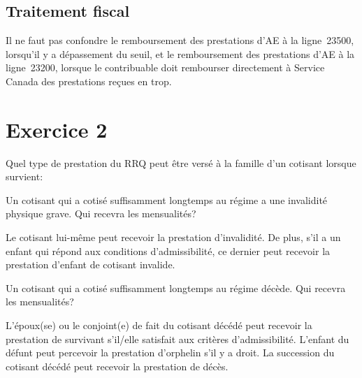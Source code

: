 \subsection{Traitement fiscal}
Il ne faut pas confondre le remboursement des prestations d'AE à la ligne~23500, lorsqu'il y a dépassement du seuil, et le remboursement des prestations d'AE à la ligne~23200, lorsque le contribuable doit rembourser directement à Service Canada des prestations reçues en trop.



\section{Exercice 2}
\setcounter{question}{0}
\begin{question}
	Quel type de prestation du RRQ peut être versé à la famille d'un cotisant lorsque survient: 
\end{question}
\setcounter{sousQuestion}{0}
\begin{sousQuestion}
	Un cotisant qui a cotisé suffisamment longtemps au régime a une invalidité physique grave. Qui recevra les mensualités?
\end{sousQuestion}
Le cotisant lui-même peut recevoir la prestation d'invalidité. De plus, s'il a un enfant qui répond aux conditions d'admissibilité, ce dernier peut recevoir la prestation d'enfant de cotisant invalide.

\begin{sousQuestion}
	Un cotisant qui a cotisé suffisamment longtemps au régime décède. Qui recevra les mensualités?
\end{sousQuestion}
L'époux(se) ou le conjoint(e) de fait du cotisant décédé peut recevoir la prestation de survivant s'il/elle satisfait aux critères d'admissibilité. L'enfant du défunt peut percevoir la prestation d'orphelin s'il y a droit. La succession du cotisant décédé peut recevoir la prestation de décès.

